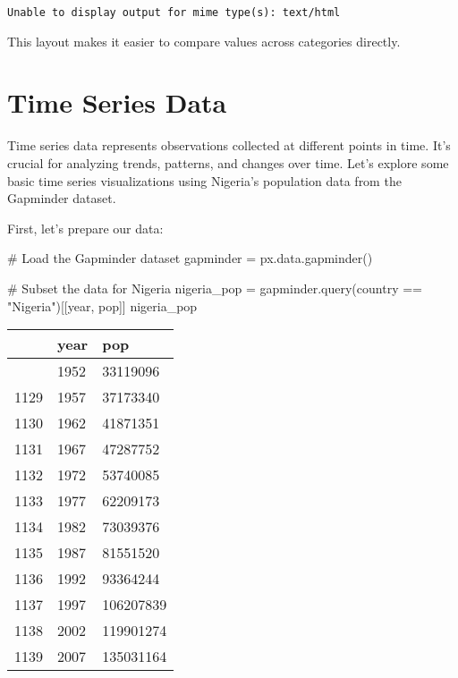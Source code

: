 \documentclass[
  letterpaper,
  DIV=11,
  numbers=noendperiod]{scrreprt}
\newenvironment{Shaded}{\begin{snugshade}}{\end{snugshade}}
\newcommand{\CommentTok}[1]{\textcolor[rgb]{0.37,0.37,0.37}{#1}}
\newcommand{\NormalTok}[1]{\textcolor[rgb]{0.00,0.23,0.31}{#1}}
\newcommand{\OperatorTok}[1]{\textcolor[rgb]{0.37,0.37,0.37}{#1}}
\newcommand{\StringTok}[1]{\textcolor[rgb]{0.13,0.47,0.30}{#1}}
\begin{document}
\begin{verbatim}
Unable to display output for mime type(s): text/html
\end{verbatim}

This layout makes it easier to compare values across categories
directly.

\section{Time Series Data}\label{time-series-data}

Time series data represents observations collected at different points
in time. It's crucial for analyzing trends, patterns, and changes over
time. Let's explore some basic time series visualizations using
Nigeria's population data from the Gapminder dataset.

First, let's prepare our data:

\begin{Shaded}
\begin{Highlighting}[]
\CommentTok{\# Load the Gapminder dataset}
\NormalTok{gapminder }\OperatorTok{=}\NormalTok{ px.data.gapminder()}

\CommentTok{\# Subset the data for Nigeria}
\NormalTok{nigeria\_pop }\OperatorTok{=}\NormalTok{ gapminder.query(}\StringTok{\textquotesingle{}country == "Nigeria"\textquotesingle{}}\NormalTok{)[[}\StringTok{\textquotesingle{}year\textquotesingle{}}\NormalTok{, }\StringTok{\textquotesingle{}pop\textquotesingle{}}\NormalTok{]]}
\NormalTok{nigeria\_pop}
\end{Highlighting}
\end{Shaded}

\begin{longtable}[]{@{}lll@{}}
\toprule\noalign{}
& year & pop \\
\midrule\noalign{}
\endhead
\bottomrule\noalign{}
\endlastfoot
1128 & 1952 & 33119096 \\
1129 & 1957 & 37173340 \\
1130 & 1962 & 41871351 \\
1131 & 1967 & 47287752 \\
1132 & 1972 & 53740085 \\
1133 & 1977 & 62209173 \\
1134 & 1982 & 73039376 \\
1135 & 1987 & 81551520 \\
1136 & 1992 & 93364244 \\
1137 & 1997 & 106207839 \\
1138 & 2002 & 119901274 \\
1139 & 2007 & 135031164 \\
\end{longtable}
\end{document}
